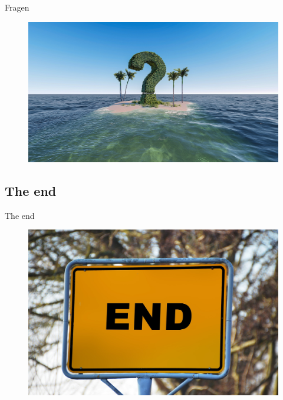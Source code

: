 \begin{frame}{Fragen}
  \begin{figure}[!ht]
     \centering
     \includegraphics[width=0.9\linewidth]{img/question-mark-3255140_1920.jpg}
  \end{figure}
\end{frame}

\subsection{The end}

\begin{frame}{The end}
  \begin{figure}[!ht]
     \centering
     \includegraphics[width=0.8\linewidth]{img/town-sign-1158385_1920.jpg}
  \end{figure}
\end{frame}



